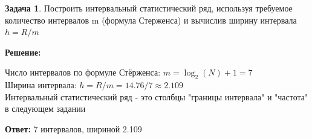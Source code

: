 \documentclass[a4paper,12pt]{article}
\theoremstyle{definition}
\newtheorem{problem}{Задача}\setlength{\parindent}{0pt}
\newenvironment{solution}
{\begin{shaded}\textbf{Решение:}\par\setlength{\parindent}{0pt}}
{\end{shaded}}
\newenvironment{answer}
{\par\noindent\textbf{Ответ:} }
{\par}
\begin{document}
\vspace{8pt}
\begin{problem}
    Построить интервальный статистический ряд, используя требуемое количество
    интервалов m (формула Стерженса) и вычислив ширину интервала \(h = R/m\)
    
        \begin{solution}
            Число интервалов по формуле Стёрженса: \( m = \log_2 (N) + 1 =7\) \\
            Ширина интервала: \( h = R/m = 14.76/7 \approx 2.109\) \\
            Интервальный статистический ряд - это столбцы "границы интервала" 
            и "частота" в следующем задании
        \end{solution}
    
        \begin{answer}
            7 интервалов, шириной 2.109
        \end{answer}
    
    \end{problem}
\end{document}
